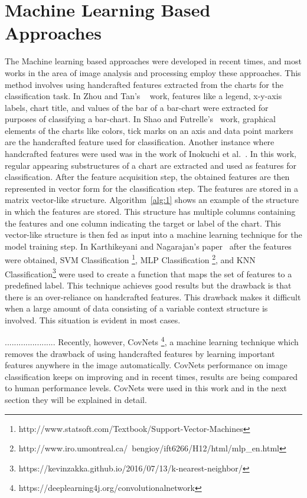 \documentclass[12pt, a4paper,oneside]{report}
\begin{document}
\section{Machine Learning Based Approaches}
The Machine learning based approaches were developed in recent times, and most works in the area of image analysis and processing employ these approaches. This method involves using handcrafted features extracted from the charts for the classification task. In Zhou and Tan's ~\cite{zhou2000bar} work, features like a legend, x-y-axis labels, chart title, and values of the bar of a bar-chart were extracted for purposes of classifying a bar-chart. In Shao and  Futrelle's~\cite{shao2005recognition} work, graphical elements of the charts like colors, tick marks on an axis and data point markers are the handcrafted feature used for classification. Another instance where handcrafted features were used was in the work of Inokuchi et al.~\cite{inokuchi2000apriori}. In this work, regular appearing substructures of a chart are extracted and used as features for classification. After the feature acquisition step, the obtained features are then represented in vector form for the classification step. The features are stored in a matrix vector-like structure. Algorithm~\ref{alg:1} shows an example of the structure in which the features are stored. This structure has multiple columns containing the features and one column indicating the target or label of the chart. This vector-like structure is then fed as input into a machine learning technique for the model training step. In Karthikeyani and Nagarajan's paper~\cite{karthikeyani2012machine} after the features were obtained, SVM Classification \footnote{http://www.statsoft.com/Textbook/Support-Vector-Machines}, MLP Classification
\footnote{http://www.iro.umontreal.ca/~bengioy/ift6266/H12/html/mlp\_en.html}, and  KNN Classification\footnote{
https://kevinzakka.github.io/2016/07/13/k-nearest-neighbor/} were used to create a function that maps the set of features to a predefined label. This technique achieves good results but the drawback is that there is an over-reliance on handcrafted features. This drawback makes it difficult when a large amount of data consisting of a variable context structure is involved. This situation is evident in most cases. 

......................
Recently, however, CovNets \footnote{https://deeplearning4j.org/convolutionalnetwork}, a machine learning technique which removes the drawback of using handcrafted features by learning important features anywhere in the image automatically. CovNets performance on image classification keeps on improving and in recent times, results are being compared to human performance levels. CovNets were used in this work and in the next section they will be explained in detail.
\end{document}
